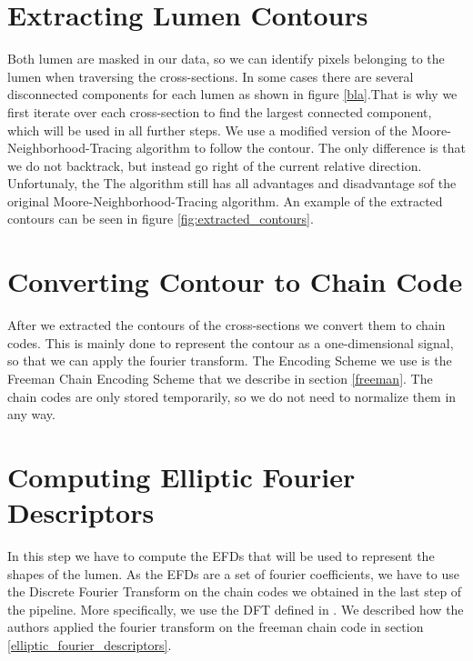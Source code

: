 \documentclass[thesis.tex]{subfiles}
\begin{document}
\section{Extracting Lumen Contours}
Both lumen are masked in our data, so we can identify pixels belonging to the lumen when traversing the cross-sections. In some cases there are several disconnected components for each lumen as shown in figure \ref{bla}.That is why we first iterate over each cross-section to find the largest connected component, which will be used  in all further steps. We use a modified version of the Moore-Neighborhood-Tracing algorithm to follow the contour. The only difference is that we do not backtrack, but instead go right of the current relative direction. Unfortunaly, the The algorithm still has all advantages and disadvantage sof the original Moore-Neighborhood-Tracing algorithm. An example of the extracted contours can be seen in figure \ref{fig:extracted_contours}.

\section{Converting Contour to Chain Code}
After we extracted the contours of the cross-sections we convert them to chain codes. This is mainly done to represent the contour as a one-dimensional signal, so that we can apply the fourier transform. The Encoding Scheme we use is the Freeman Chain Encoding Scheme that we describe in section \ref{freeman}. The chain codes are only stored temporarily, so we do not need to normalize them in any way.

\section{Computing Elliptic Fourier Descriptors}
In this step we have to compute the EFDs that will be used to represent the shapes of the lumen. As the EFDs are a set of fourier coefficients, we have to use the Discrete Fourier Transform on the chain codes we obtained in the last step of the pipeline. More specifically, we use the DFT defined in \cite{giardinia}. We described how the authors applied the fourier transform on the freeman chain code in section \ref{elliptic_fourier_descriptors}. 
\end{document}
